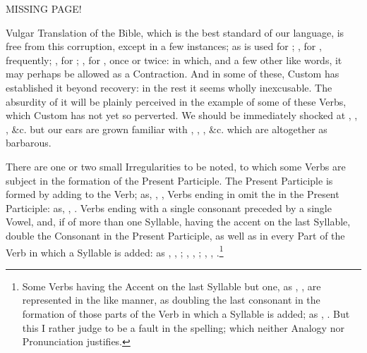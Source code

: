 MISSING PAGE!

Vulgar Translation of the Bible, which is the best standard of our
language, is free from this corruption, except in a few instances; as
 is used for ; , for ,
frequently; , for ; , for ,
once or twice: in which, and a few other like words, it may perhaps be
allowed as a Contraction. And in some of these, Custom has established
it beyond recovery: in the rest it seems wholly inexcusable. The
absurdity of it will be plainly perceived in the example of some of
these Verbs, which Custom has not yet so perverted. We should be
immediately shocked at , , , \&c. but our ears are grown familiar with ,
, , \&c. which are altogether as
barbarous.

There are one or two small Irregularities to be noted, to which some
Verbs are subject in the formation of the Present Participle. The
Present Participle is formed by adding  to the Verb; as,
, , Verbs ending in  omit the  in the
Present Participle: as, , . Verbs ending with a
single consonant preceded by a single Vowel, and, if of more than one
Syllable, having the accent on the last Syllable, double the Consonant
in the Present Participle, as well as in every Part of the Verb in which
a Syllable is added: as , , ;
, , ; , ,
.\footnote{Some Verbs having the Accent on the last Syllable
but one, as , , are represented in the like
manner, as doubling the last consonant in the formation of those parts
of the Verb in which a Syllable is added; as ,
. But this I rather judge to be a fault in the spelling;
which neither Analogy nor Pronunciation justifies.}
